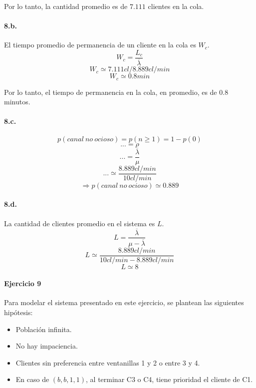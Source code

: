 \documentclass{article}
\begin{document}
      Por lo tanto, la cantidad promedio es de $7.111$ clientes en la cola.


   \paragraph{8.b.} El tiempo promedio de permanencia de un cliente en la cola es $W_c$.
      $$ W_c = \frac{L_c}{\overline{\lambda}} $$
      $$ W_c \simeq 7.111cl / 8.889cl/min $$
      $$ W_c \simeq 0.8min $$

      Por lo tanto, el tiempo de permanencia en la cola, en promedio, es de $0.8$ minutos.


   \paragraph{8.c.}
      $$ p(canal\:no\:ocioso) = p(n \ge 1) = 1 - p(0) $$
      $$ ... = \rho $$
      $$ ... = \frac{\overline{\lambda}}{\mu} $$
      $$ ... \simeq \frac{8.889cl/min}{10cl/min} $$
      $$ \Rightarrow p(canal\:no\:ocioso) \simeq 0.889 $$

   \paragraph{8.d.} La cantidad de clientes promedio en el sistema es $L$.
      $$ L = \frac{\overline{\lambda}}{\mu - \overline{\lambda}}$$
      $$ L \simeq \frac{8.889cl/min}{10cl/min - 8.889cl/min} $$
      $$ L \simeq 8 $$


\paragraph{Ejercicio 9}
   Para modelar el sistema presentado en este ejercicio, se plantean las siguientes hipótesis:

   \begin{itemize}
      \item Población infinita.
      \item No hay impaciencia.
      \item Clientes sin preferencia entre ventanillas 1 y 2 o entre 3 y 4.
      \item En caso de $(b, b, 1, 1)$, al terminar C3 o C4, tiene prioridad el cliente de C1.
   \end{itemize}
\end{document}

